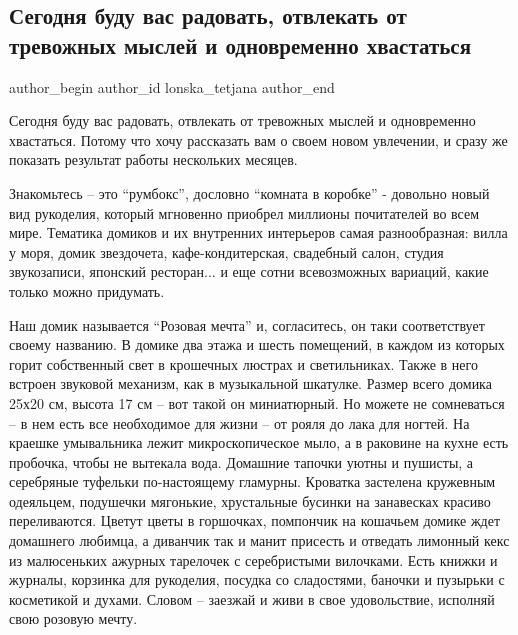  
 
 
 
 
 
\subsection{Сегодня буду вас радовать, отвлекать от тревожных мыслей и одновременно хвастаться}
\label{sec:01_06_2022.fb.lonska_tetjana.1.rumboks}
 
\ifcmt
 author_begin
   author_id lonska_tetjana
 author_end
\fi

Сегодня буду вас радовать, отвлекать от тревожных мыслей и одновременно
хвастаться.  Потому что хочу рассказать вам о своем новом увлечении, и сразу же
показать результат работы нескольких месяцев. 

Знакомьтесь – это \enquote{румбокс}, дословно \enquote{комната в коробке} - довольно новый
вид рукоделия, который мгновенно приобрел миллионы почитателей во всем
мире. Тематика домиков и их внутренних интерьеров  самая разнообразная:
вилла у моря, домик звездочета, кафе-кондитерская, свадебный салон, студия
звукозаписи, японский ресторан... и еще сотни всевозможных вариаций, какие
только можно придумать.

Наш домик называется \enquote{Розовая мечта} и, согласитесь, он таки
соответствует своему названию. В домике два этажа и шесть помещений, в
каждом из которых горит собственный свет в крошечных люстрах и
светильниках. Также в него встроен звуковой механизм, как в музыкальной
шкатулке. Размер всего домика 25х20 см, высота 17 см – вот такой он
миниатюрный. Но можете не сомневаться – в нем есть все необходимое для
жизни – от рояля до лака для ногтей. На краешке умывальника лежит
микроскопическое мыло, а в раковине на кухне есть пробочка, чтобы не
вытекала вода.  Домашние тапочки уютны и пушисты, а серебряные туфельки
по-настоящему гламурны. Кроватка застелена кружевным одеяльцем, подушечки
мягонькие, хрустальные бусинки на занавесках красиво переливаются. Цветут
цветы в горшочках, помпончик на кошачьем домике ждет домашнего любимца, а
диванчик так и манит присесть и отведать лимонный кекс из малюсеньких
ажурных тарелочек с серебристыми вилочками.  Есть книжки и журналы,
корзинка для рукоделия, посудка со сладостями, баночки и пузырьки с
косметикой и духами. Словом – заезжай и живи в свое удовольствие,
исполняй свою розовую мечту.

